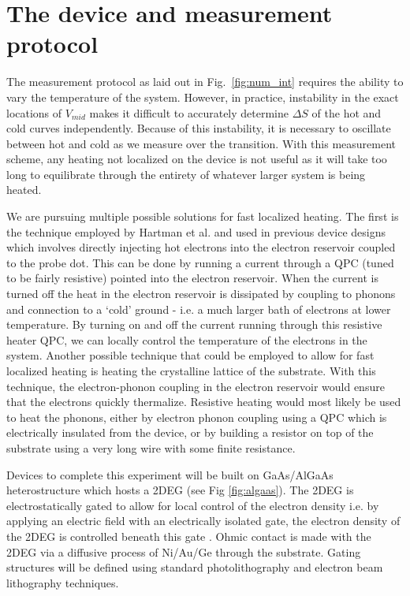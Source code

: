 \section{The device and measurement protocol}
\label{sec:device}
The measurement protocol as laid out in Fig.~\ref{fig:num_int} requires the ability to vary the temperature of the system. However, in practice, instability in the exact locations of $V_{mid}$ makes it difficult to accurately determine $\Delta S$ of the hot and cold curves independently. Because of this instability, it is necessary to oscillate between hot and cold as we measure over the transition. With this measurement scheme, any heating not localized on the device is not useful as it will take too long to equilibrate through the entirety of whatever larger system is being heated.

We are pursuing multiple possible solutions for fast localized heating. The first is the technique employed by Hartman et al. and used in previous device designs which involves directly injecting hot electrons into the electron reservoir coupled to the probe dot. This can be done by running a current through a QPC (tuned to be fairly resistive) pointed into the electron reservoir. When the current is turned off the heat in the electron reservoir is dissipated by coupling to phonons and connection to a `cold' ground - i.e. a much larger bath of electrons at lower temperature. By turning on and off the current running through this resistive heater QPC, we can locally control the temperature of the electrons in the system. Another possible technique that could be employed to allow for fast localized heating is heating the crystalline lattice of the substrate. With this technique, the electron-phonon coupling in the electron reservoir would ensure that the electrons quickly thermalize. Resistive heating would most likely be used to heat the phonons, either by electron phonon coupling using a QPC which is electrically insulated from the device, or by building a resistor on top of the substrate using a very long wire with some finite resistance.

Devices to complete this experiment will be built on GaAs/AlGaAs heterostructure which hosts a 2DEG (see Fig \ref{fig:algaas}). The 2DEG is electrostatically gated to allow for local control of the electron density i.e. by applying an electric field with an electrically isolated gate, the electron density of the 2DEG is controlled beneath this gate \cite{Kouwenhoven1997}. Ohmic contact is made with the 2DEG via a diffusive process of Ni/Au/Ge through the substrate. Gating structures will be defined using standard photolithography and electron beam lithography techniques.  

